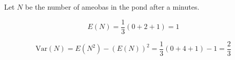 Let $N$ be the number of ameobas in the pond after a minutes.

$$E(N) = \frac{1}{3}(0 + 2 + 1) = 1$$

$$\text{Var}(N) = E(N^{2}) - (E(N))^{2} = \frac{1}{3}(0 + 4 + 1) - 1 = \frac{2}
{3}$$
